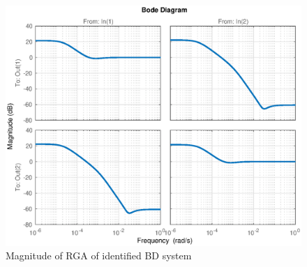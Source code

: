 \documentclass[12pt]{article}
\begin{document}
\begin{figure}[p]
\centering
\includegraphics[width=\textwidth]{../Systemanalyse/Log_Data_to_Matlab/Figurer/Identifisering/BD_RGA.eps}
\caption{Magnitude of RGA of identified BD system}
\label{fig:BD_RGA}
\end{figure}
\end{document}
